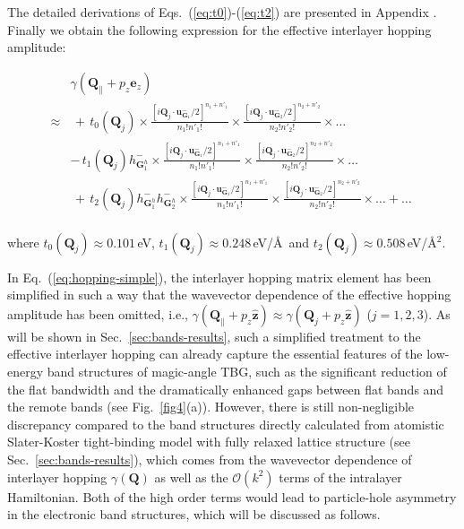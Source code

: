 \documentclass[aps,prx,10pt,twocolumn,superscriptaddress]{revtex4}
\def\V{{\uppercase\expandafter{\romannumeral 5}}}
\def\angstrom{\mbox{\normalfont\AA}}
\def\nn{\nonumber\\}
\def\angstrom{\mbox{\normalfont\AA}}
\def\nn{\nonumber\\}
\begin{document}
The detailed derivations of Eqs.~(\ref{eq:t0})-(\ref{eq:t2}) are presented in Appendix \V.
Finally  we obtain the following expression for the effective interlayer hopping amplitude:
\begin{widetext}
\allowdisplaybreaks
\begin{align}\label{eq:intert0t1t2}
&\gamma(\textbf{Q}_{\parallel}+p_{z}\textbf{e}_{z})\nonumber\\
\approx&\,+\, t_{0}(\mathbf{Q}_j)\times\frac{\left[i\textbf{Q}_j\cdot\textbf{u}^{-}_{\textbf{G}_{1}}/2\right]^{n_{1}+n'_{1}}}{n_{1}!n'_{1}!}\times\frac{\left[i\textbf{Q}_j\cdot\textbf{u}^{-}_{\textbf{G}_{2}}/2\right]^{n_{2}+n'_{2}}}{n_{2}!n'_{2}!}\times \dots \,\nn
&-\,t_{1}(\mathbf{Q}_j)h_{\textbf{G}_{1}^{h}}^{-}\times\frac{\left[i\textbf{Q}_j\cdot\textbf{u}^{-}_{\textbf{G}_{1}}/2\right]^{n_{1}+n'_{1}}}{n_{1}!n'_{1}!}\times\frac{\left[i\textbf{Q}_j\cdot\textbf{u}^{-}_{\textbf{G}_{2}}/2\right]^{n_{2}+n'_{2}}}{n_{2}!n'_{2}!}\times\dots\nonumber\\
&\,+\,t_{2}(\mathbf{Q}_j)h_{\textbf{G}_{1}^{h}}^{-}h_{\textbf{G}_{2}^{h}}^{-}\times\frac{\left[i\textbf{Q}_j\cdot\textbf{u}^{-}_{\textbf{G}_{1}}/2\right]^{n_{1}+n'_{1}}}{n_{1}!n'_{1}!}\times\frac{\left[i\textbf{Q}_j\cdot\textbf{u}^{-}_{\textbf{G}_{2}}/2\right]^{n_{2}+n'_{2}}}{n_{2}!n'_{2}!}\times\dots +\dots\;\nn
\end{align}
\end{widetext}
%
where $t_{0}(\mathbf{Q}_j)\!\approx\!0.101\,$eV, $t_{1}(\mathbf{Q}_j)\!\approx\!0.248\,$eV/\angstrom\ and $t_{2}(\mathbf{Q}_j)\!\approx\!0.508\,$eV/\angstrom$^2$.


In Eq.~(\ref{eq:hopping-simple}), the interlayer hopping matrix element has been simplified in such a way that the wavevector dependence of the effective hopping amplitude has been omitted, i.e., $\gamma(\mathbf{Q}_{\parallel}+p_z\hat{\mathbf{z}})\approx\gamma(\mathbf{Q}_j+p_z\hat{\mathbf{z}})$ ($j=1, 2, 3$). As will be shown in Sec.~\ref{sec:bands-results}, such a simplified treatment to the effective interlayer hopping can already capture the essential features of the low-energy band structures of magic-angle TBG, such as the significant reduction of the flat bandwidth and the dramatically enhanced gaps between flat bands and the remote bands (see Fig.~\ref{fig4}(a)). However, there is still non-negligible discrepancy compared to the band structures directly calculated from atomistic Slater-Koster tight-binding model with fully relaxed lattice structure (see Sec.~\ref{sec:bands-results}), which comes from the wavevector dependence of interlayer hopping $\gamma(\mathbf{Q})$ as well as the $\mathcal{O}(k^2)$ terms of the intralayer Hamiltonian. Both of the high order terms would lead to particle-hole asymmetry in the electronic band structures, which will be discussed as follows. 
\end{document}
